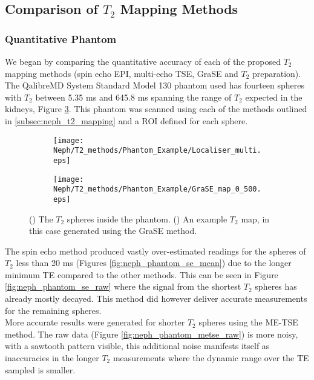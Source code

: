 \subsection{Comparison of $T_2$ Mapping Methods}

\subsubsection{Quantitative Phantom}

We began by comparing the quantitative accuracy of each of the proposed $T_2$ mapping methods (spin echo \ac{EPI}, multi-echo \ac{TSE}, \ac{GraSE} and $T_2$ preparation).  The QalibreMD System Standard Model 130 phantom used has fourteen spheres with $T_2$ between 5.35 ms and 645.8 ms spanning the range of $T_2$ expected in the kidneys, Figure \ref{fig:neph_phantom_eg}. This phantom was scanned using each of the methods outlined in \ref{subsec:neph_t2_mapping} and a \ac{ROI} defined for each sphere. 

\begin{figure}[H]
	\centering
	\begin{subfigure}[c]{0.47\textwidth}
		\centering
		\texttt{[image: Neph/T2\_methods/Phantom\_Example/Localiser\_multi.eps]}
		\caption{}
		\label{fig:neph_phantom_loc}
	\end{subfigure}
	\hfill
	\begin{subfigure}[c]{0.47\textwidth}
		\centering
		\texttt{[image: Neph/T2\_methods/Phantom\_Example/GraSE\_map\_0\_500.eps]}
		\caption{}
		\label{fig:neph_phantom_map}
	\end{subfigure}
	\caption{() The $T_2$ spheres inside the phantom. () An example $T_2$ map, in this case generated using the \ac{GraSE} method.}
	\label{fig:neph_phantom_eg}
\end{figure}

The spin echo method produced vastly over-estimated readings for the spheres of $T_2$ less than 20 ms (Figures \ref{fig:neph_phantom_se_mean}) due to the longer minimum \ac{TE} compared to the other methods. This can be seen in Figure \ref{fig:neph_phantom_se_raw} where the signal from the shortest $T_2$ spheres has already mostly decayed. This method did however deliver accurate measurements for the remaining spheres.\\

More accurate results were generated for shorter $T_2$ spheres using the \ac{ME-TSE} method. The raw data (Figure \ref{fig:neph_phantom_metse_raw}) is more noisy, with a sawtooth pattern visible, this additional noise manifests itself as inaccuracies in the longer $T_2$ measurements where the dynamic range over the \ac{TE} sampled is smaller.\\

